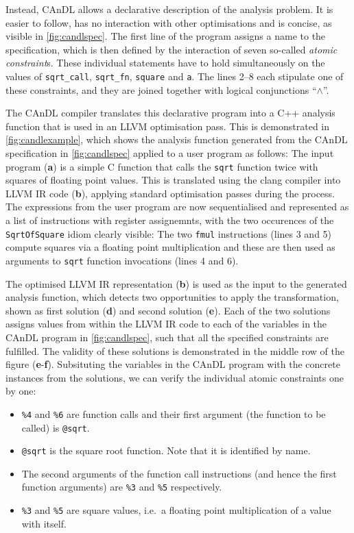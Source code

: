     Instead, CAnDL allows a declarative description of the analysis problem.
    It is easier to follow, has no interaction with other optimisations and
    is concise, as visible in \autoref{fig:candlspec}.
    The first line of the program assigns a name to the specification, which is
    then defined by the interaction of seven so-called {\em atomic constraint}s.
    These individual statements have to hold simultaneously on the values of
    \texttt{sqrt\_call}, \texttt{sqrt\_fn}, \texttt{square} and \texttt{a}.
    The lines 2--8 each stipulate one of these constraints, and they are joined
    together with logical conjunctions ``$\land$''.

    The CAnDL compiler translates this declarative program into a C++ analysis
    function that is used in an LLVM optimisation pass.
    This is demonstrated in \autoref{fig:candlexample}, which shows the analysis
    function generated from the CAnDL specification in \autoref{fig:candlspec}
    applied to a user program as follows:
    The input program ({\bf a}) is a simple C function that calls the
    \texttt{sqrt} function twice with squares of floating point values.
    This is translated using the clang compiler into LLVM IR code ({\bf b}),
    applying standard optimisation passes during the process.
    The expressions from the user program are now sequentialised and represented
    as a list of instructions with register assignemnts, with the two occurences
    of the \texttt{SqrtOfSquare} idiom clearly visible:
    The two \texttt{fmul} instructions (lines 3 and 5) compute squares via a
    floating point multiplication and these are then used as arguments to
    \texttt{sqrt} function invocations (lines 4 and 6).

    The optimised LLVM IR representation ({\bf b}) is used as the input to the
    generated analysis function, which detects two opportunities to apply the
    transformation, shown as first solution ({\bf d}) and second solution
    ({\bf e}).
    Each of the two solutions assigns values from within the LLVM IR code to
    each of the variables in the CAnDL program in \autoref{fig:candlspec}, such
    that all the specified constraints are fulfilled.
    The validity of these solutions is demonstrated in the middle row of the
    figure ({\bf e}-{\bf f}).
    Subsituting the variables in the CAnDL program with the concrete
    instances from the solutions, we can verify the individual atomic
    constraints one by one:
    \begin{itemize}
    \item \texttt{\%4} and \texttt{\%6} are function calls and their first
          argument (the function to be called) is \texttt{@sqrt}.
    \item \texttt{@sqrt} is the square root function.
          Note that it is identified by name.
    \item The second arguments of the function call instructions (and hence the
          first function arguments) are \texttt{\%3} and \texttt{\%5}
          respectively.
    \item \texttt{\%3} and \texttt{\%5} are square values, i.e.\ a floating
          point multiplication of a value with itself.
    \end{itemize}

